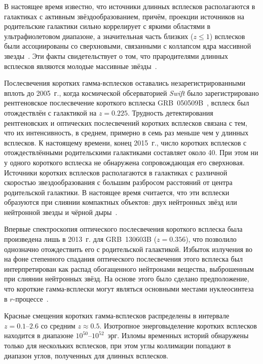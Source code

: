 В настоящее время известно, что источники длинных всплесков располагаются в галактиках 
с активным звёздообразованием, причём, проекции источников на родительские галактики сильно
коррелирует с яркими областями в ультрафиолетовом диапазоне, а значительная часть 
близких ($z \le 1$) всплесков были ассоциированы со сверхновыми, связанными с 
коллапсом ядра массивной звезды~\citep{Hjorth_and_Bloom_2012in_book}.
Эти факты свидетельствует о том, что прародителями длинных всплесков являются молодые 
массивные звёзды~\citep[см. обзор][]{Berger_2014ARAA}.

Послесвечения коротких гамма-всплесков оставались незарегистрированными вплоть 
до 2005~г., когда космической обсерваторией \textit{Swift} было зарегистрировано 
рентгеновское послесвечение короткого всплеска GRB~050509B~\citep{Gehrels_2005Natur},
всплеск был отождествлён с галактикой на $z=0.225$. 
Трудность детектирования рентгеновских и оптических послесвечений коротких всплесков 
связана с тем, что их интенсивность, в среднем, примерно в семь раз меньше чем у длинных всплесков.
К настоящему времени, конец 2015~г., число коротких всплесков с отождествлёнными 
родительскими галактиками составляет около 40. 
При этом ни у одного короткого всплеска не обнаружена сопровождающая его сверхновая.
Источники коротких всплесков располагаются в галактиках с различной скоростью 
звездообразования с большим разбросом расстояний от центра родительской галактики. 
В настоящее время считается, что эти всплески образуются при слиянии компактных 
объектов: двух нейтронных звёзд или нейтронной звезды и чёрной дыры~\citep[см. обзор][]{Berger_2014ARAA}.

Впервые спектроскопия оптического послесвечения короткого всплеска была произведена 
лишь в 2013~г. для GRB~130603B ($z = 0.356$), что позволило однозначно отождествить его 
с родительской галактикой. Избыток излучения во на фоне степенного спадания оптического 
послесвечения этого всплеска был интерпретирован как распад обогащенного 
нейтронами вещества, выброшенным при слиянии нейтронных звёзд. На основе этого 
было сделано предположение, что короткие гамма-всплески могут являться основными местами нуклеосинтеза в 
$r$-процессе~\citep{Tanvir_2013Natur}.
 
Красные смещения коротких гамма-всплесков распределены в интервале $z=0.1\mbox{--}2.6$ 
со средним $z\approx 0.5$.
Изотропное энерговыделение коротких всплесков находится в диапазоне $10^{50}$--$10^{52}$~эрг.
Изломы временных историй обнаружены только для нескольких всплесков, при этом углы коллимации 
попадают в диапазон углов, полученных для длинных всплесков. 


